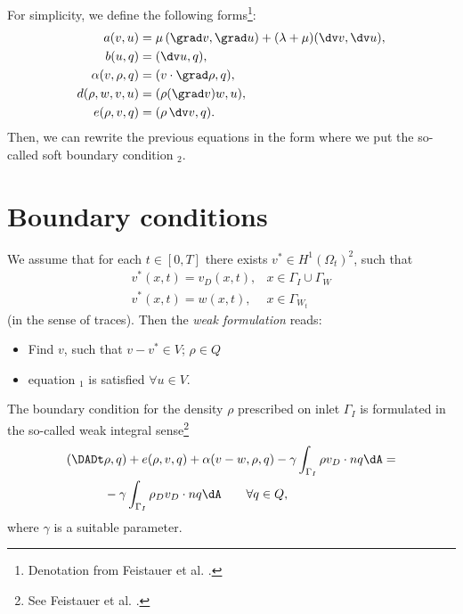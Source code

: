 For simplicity, we define the following forms\footnote{Denotation from Feistauer
et al. \cite[p. 368]{feistauer}.}: 
\[
\begin{split}
a(v,u) &= \mu\,(\grad v,\grad u) + (\lambda+\mu)(\dv v,\dv u), \\
b(u,q) &= (\dv u,q), \\
\alpha(v,\rho,q) &= (v \cdot \grad \rho,q), \\
d(\rho,w,v,u) &= (\rho(\grad v)w,u), \\
e(\rho,v,q) &= (\rho\,\dv v,q). \\
\end{split}
\]
Then, we can rewrite the previous equations in the form
where we put the so-called soft boundary condition $_2$.

\section{Boundary conditions}

We assume that for each $t\in[0,T]$ there exists $v^* \in H^1(\Omega_t)^2$,
such that 
\[
\begin{array}{ll}
v^*(x,t)=v_D(x,t), &x \in \Gamma_I \cup \Gamma_W \\
v^*(x,t)=w(x,t), &x \in \Gamma_{W_t}
\end{array}
\]
(in the sense of traces). Then the {\it weak formulation} reads:\\
\begin{itemize}
 \item Find $v$, such that $v - v^* \in V$; $\rho \in Q$
 \item equation $_1$ is satisfied $\forall u \in V$. 
\end{itemize}

The boundary condition for the density $\rho$ prescribed on inlet $\Gamma_I$ is
formulated in the so-called weak integral sense\footnote{See Feistauer et al.
\cite[p. 373]{feistauer}.} 
\[
\begin{split}
(\DADt &\rho,q) + e(\rho,v,q) + \alpha(v-w,\rho,q) 
- \gamma \int_{\Gamma_I}{\rho v_D \cdot nq}\dA = \\
&- \gamma \int_{\Gamma_I}{\rho_D v_D \cdot nq}\dA \qquad \forall q\in Q,
\end{split}
\]
where $\gamma$ is a suitable parameter.

